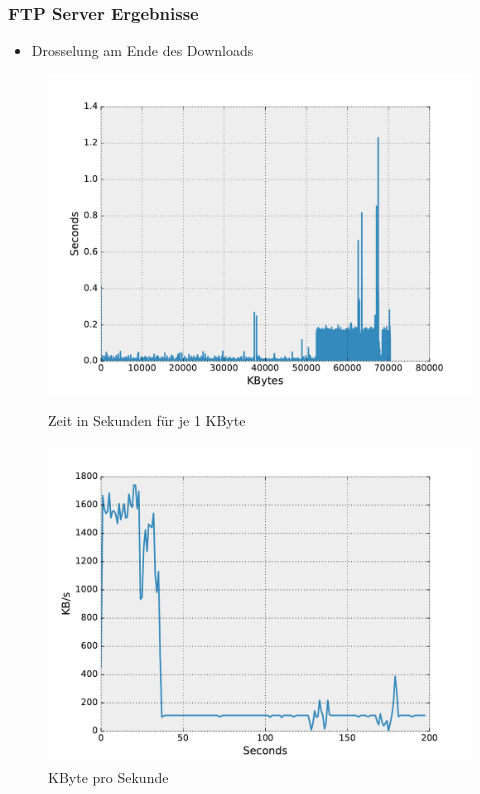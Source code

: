 \documentclass[handout]{beamer}
\begin{document}
\begin{frame}
\frametitle{FTP Server Ergebnisse}
\begin{itemize}
\item Drosselung am Ende des Downloads
\end{itemize}
\begin{figure}
\centering
\begin{minipage}[t]{0.4\linewidth}
			\centering
			\includegraphics[width=\linewidth]{images/seconds_ftp.pdf}
			\caption{Zeit in Sekunden für je 1 KByte}
\end{minipage}
\begin{minipage}[t]{0.4\linewidth}
			\centering
			\includegraphics[width=\linewidth]{images/datarate_ftp.pdf}
			\caption{KByte pro Sekunde}
\end{minipage}
\end{figure}
\end{frame}
\end{document}
